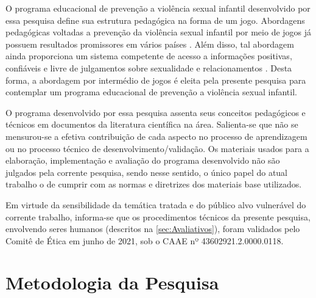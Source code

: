 O programa educacional de prevenção a violência sexual infantil desenvolvido por essa pesquisa define sua estrutura pedagógica na forma de um jogo. Abordagens pedagógicas voltadas a prevenção da violência sexual infantil por meio de jogos já possuem resultados promissores em vários países \cite{muller2014child, fingerle2018abschlussbericht}. Além disso, tal abordagem ainda proporciona um sistema competente de acesso a informações positivas, confiáveis e livre de julgamentos sobre sexualidade e relacionamentos \cite{unesco2018international}. Desta forma, a abordagem por intermédio de jogos é eleita pela presente pesquisa para contemplar um programa educacional de prevenção a violência sexual infantil. 

O programa desenvolvido por essa pesquisa assenta seus conceitos pedagógicos e técnicos em documentos da literatura científica na área. Salienta-se que não se mensurou-se a efetiva contribuição de cada aspecto no processo de aprendizagem ou no processo técnico de desenvolvimento/validação. Os materiais usados para a elaboração, implementação e avaliação do programa desenvolvido não são julgados pela corrente pesquisa, sendo nesse sentido, o único papel do atual trabalho o de cumprir com as normas e diretrizes dos materiais base utilizados. 


Em virtude da sensibilidade da temática tratada e do público alvo vulnerável do corrente trabalho, informa-se que os procedimentos técnicos da presente pesquisa, envolvendo seres humanos (descritos na \autoref{sec:Avaliativos}), foram validados pelo Comitê de Ética em junho de 2021, sob o \ac{CAAE} nº 43602921.2.0000.0118. %

\newpage
\section{Metodologia da Pesquisa}\label{sec:Metodologia}

